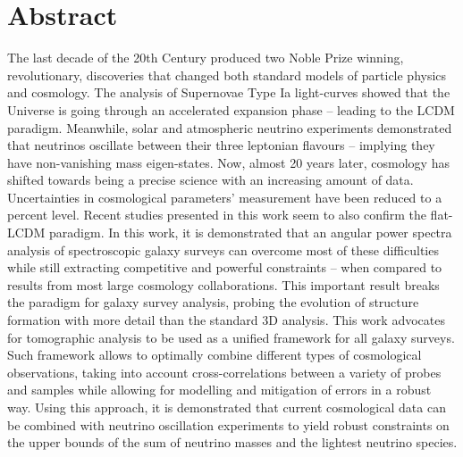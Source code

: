 %
\chapter*{Abstract}
\label{sec:abstract}
\vspace*{-10mm}

The last decade of the 20th Century produced two Noble Prize winning, revolutionary, discoveries that changed both standard models of particle physics and cosmology. The analysis of Supernovae Type Ia light-curves showed that the Universe is going through an accelerated expansion phase -- leading to the LCDM paradigm. Meanwhile, solar and atmospheric neutrino experiments demonstrated that neutrinos oscillate between their three leptonian flavours -- implying they have non-vanishing mass eigen-states. Now, almost 20 years later, cosmology has shifted towards being a precise science with an increasing amount of data. Uncertainties in cosmological parameters' measurement have been reduced to a percent level. Recent studies presented in this work seem to also confirm the flat-LCDM paradigm. In this work, it is demonstrated that an angular power spectra analysis of spectroscopic galaxy surveys can overcome most of these difficulties while still extracting competitive and powerful constraints -- when compared to results from most large cosmology collaborations. This important result breaks the paradigm for galaxy survey analysis, probing the evolution of structure formation with more detail than the standard 3D analysis. This work advocates for tomographic analysis to be used as a unified framework for all galaxy surveys. Such framework allows to optimally combine different types of cosmological observations, taking into account cross-correlations between a variety of probes and samples while allowing for modelling and mitigation of errors in a robust way. Using this approach, it is demonstrated that current cosmological data can be combined with neutrino oscillation experiments to yield robust constraints on the upper bounds of the sum of neutrino masses and the lightest neutrino species. %